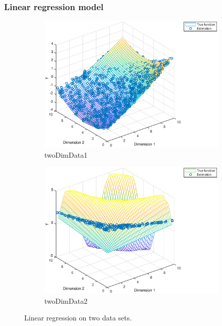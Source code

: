 \documentclass[]{article}
\begin{document}
\subsubsection{Linear regression model}
\begin{figure}[ht]
\centering
\begin{subfigure}{.49\textwidth}
	\centering
	\includegraphics[scale=0.4]{project41c1}
	\caption{twoDimData1}
	\label{fig:twoDimData1-LR}
\end{subfigure}
\begin{subfigure}{.49\textwidth}
	\centering
	\includegraphics[scale=0.4]{project41c2}
	\caption{twoDimData2}
	\label{fig:twodimData2-LR}
\end{subfigure}
\caption{Linear regression on two data sets.}
\label{fig:twoDimData-LR}
\end{figure}
\end{document}
